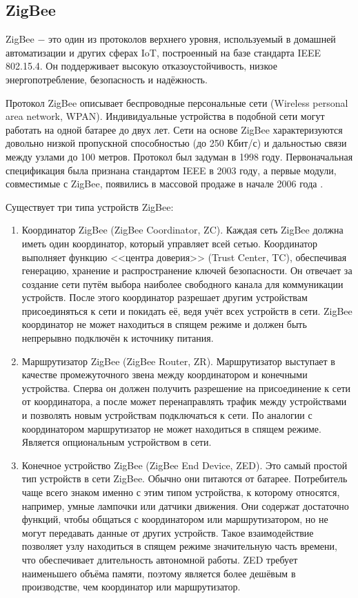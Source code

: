 	\subsection{ZigBee}
	ZigBee $-$ это один из протоколов верхнего уровня, используемый в домашней автоматизации и других
	сферах IoT, построенный на базе стандарта IEEE 802.15.4. Он поддерживает высокую отказоустойчивость, 
	низкое энергопотребление, безопасность и надёжность.
	
	Протокол ZigBee описывает беспроводные персональные сети (Wireless personal area network, WPAN).
	Индивидуальные устройства в подобной сети могут работать на одной батарее до двух лет.
	Сети на основе ZigBee характеризуются довольно низкой пропускной способностью (до 250 Кбит/с) и
	дальностью связи между узлами до 100 метров. Протокол был задуман в 1998 году. Первоначальная 
	спецификация была признана стандартом IEEE в 2003 году, а первые модули, совместимые с ZigBee, 
	появились в массовой продаже в начале 2006 года \cite{zigbee-certified-products}.
	
	Существует три типа устройств ZigBee:
	
	\begin{enumerate}
		\item Координатор ZigBee (ZigBee Coordinator, ZC). Каждая сеть ZigBee должна иметь один координатор,
		который управляет всей сетью. Координатор выполняет функцию <<центра доверия>> (Trust Center, TC),
		обеспечивая генерацию, хранение и распространение ключей безопасности. Он отвечает за создание сети
		путём выбора наиболее свободного канала для коммуникации устройств. После этого координатор 
		разрешает другим устройствам присоединяться к сети и покидать её, ведя учёт всех устройств в сети.
		ZigBee координатор не может находиться в спящем режиме и должен быть непрерывно подключён
		к источнику питания.
		\item Маршрутизатор ZigBee (ZigBee Router, ZR). Маршрутизатор выступает в качестве промежуточного
		звена между координатором и конечными устройства. Сперва он должен получить разрешение на
		присоединение к сети от координатора, а после может перенаправлять трафик между устройствами и 
		позволять новым устройствам подключаться к сети. По аналогии с координатором маршрутизатор не
		может находиться в спящем режиме. Является опциональным устройством в сети.
		\item Конечное устройство ZigBee (ZigBee End Device, ZED). Это самый простой тип устройств в сети
		ZigBee. Обычно они питаются от батарее. Потребитель чаще всего знаком именно с этим типом
		устройства, к которому относятся, например, умные лампочки или датчики движения. Они содержат 
		достаточно функций, чтобы общаться с координатором или маршрутизатором, но не могут передавать 
		данные от других устройств. Такое взаимодействие позволяет узлу находиться в спящем режиме 
		значительную часть времени, что обеспечивает длительность автономной работы. ZED требует 
		наименьшего объёма памяти, поэтому является более дешёвым в производстве, чем координатор 
		или маршрутизатор.
	\end{enumerate}

